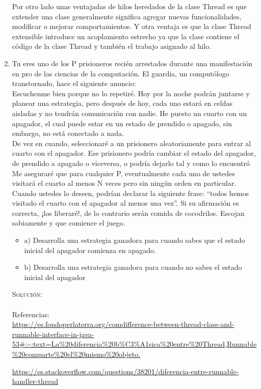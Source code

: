 \documentclass[letterpaper,10pt]{article}
\begin{document}
\begin{enumerate}
	Por otro lado unas ventajadas de hilos heredados de la clase Thread es que extender una clase generalmente significa agregar nuevas funcionalidades, modificar o mejorar comportamientos.
	Y otra ventaja es que la clase Thread extensible introduce un acoplamiento estrecho ya que la clase contiene el código de la clase Thread y también el trabajo asignado al hilo.\\
	
	
    \item Tu eres uno de los P prisioneros recién arrestados durante una manifestación en pro de las ciencias de la computación. El guardia, un computólogo transtornado, hace el siguiente anuncio:\\
   
    Escuchenme bien porque no lo repetiré. Hoy por la noche podrán juntarse y
planear una estrategia, pero después de hoy, cada uno estará en celdas aisladas y no tendrán comunicación con nadie. He puesto un cuarto con un apagador, el cual puede estar en un estado de prendido o apagado, sin embargo, no está conectado a nada.\\
De vez en cuando, seleccionaré a un prisionero aleatoriamente para entrar al cuarto con el apagador. Ese prisionero podría cambiar el estado del apagador, de prendido a apagado o viceversa, o podría dejarlo tal y como lo encuentró\\
Me aseguraré que para cualquier P, eventualmente cada uno de ustedes visitará el cuarto al menos N veces pero sin ningún orden en particular. Cuando ustedes lo deseen, podrían declarar la siguiente frase: “todos hemos visitado el cuarto con el apagador al menos una vez”. Si su afirmación es correcta, ¡los liberaré!, de lo contrario serán comida de cocodrilos. Escojan sabiamente y que comience el juego.\\

	\begin{itemize}
	\item a) Desarrolla una estrategia ganadora para cuando sabes que el estado inicial del apagador comienza en apagado.
	
	\item b) Desarrolla una estrategia ganadora para cuando no sabes el estado inicial del apagador
	\end{itemize}

    \textsc{Solución:}
	\\
	\\
	
	
	Referencias:\\
	\url{https://es.fondoperlaterra.org/comdifference-between-thread-class-and-runnable-interface-in-java-53#:~:text=La%20diferencia%20b%C3%A1sica%20entre%20Thread,Runnable%20comparte%20el%20mismo%20objeto.}
	
	\url{https://es.stackoverflow.com/questions/38201/diferencia-entre-runnable-handler-thread}
    

	
 \end{enumerate}
\end{document}
